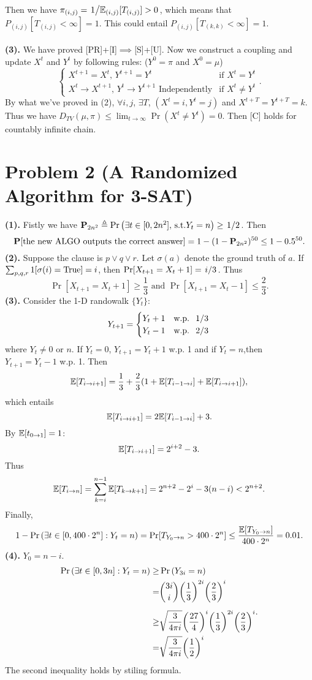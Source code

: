 \documentclass{article}
\begin{document}
Then we have $\pi_{(i,j)}=\flatfrac{1}{\=E_{(i,j)}[T_{(i,j)}]>0}$, which means that $P_{(i,j)}[T_{(i,j)}<\infty]=1$. This could entail $P_{(i,j)}[T_{(k,k)}<\infty]=1$.
\\\\
\textbf{(3).}
We have proved [PR]+[I]$\implies$[S]+[U]. Now we construct a coupling and update $X^t$ and  $Y^t$ by following rules: ($Y^0=\pi$ and $X^0=\mu$)
\[
	\begin{cases}
		X^{t+1}=X^t,\,Y^{t+1}=Y^t                                & \text{if }X^t=Y^t
		\\
		X^{t}\to X^{t+1},\,Y^{t}\to Y^{t+1}\text{ Independently} & \text{if }X^t\ne Y^t
	\end{cases}
	.\]
By what we've proved in (2), $\forall i,j$, $\exists T$, $(X^t=i,Y^t=j)$ and $X^{t+T}=Y^{t+T}=k$. Thus we have $D_{TV}(\mu,\pi)\le \lim_{t\to\infty}\Pr(X^t\ne Y^t)=0$.
Then [C] holds for countably infinite chain.
\newpage
\section*{Problem 2 (A Randomized Algorithm for 3-SAT)}
\textbf{(1).}
Fistly we have $\P_{2n^2}\defeq\Pr\qty(\exists t\in[0,2n^2],\,\-{s.t.}Y_t=n)\ge \flatfrac{1}{2}$. Then
\[
	\P[\text{the new ALGO outputs the correct answer}]
	=
	1-(1-\P_{2n^2})^{50}\le 1-0.5^{50}
	.\]
\textbf{(2).}
Suppose the clause is $p\lor q\lor r$. Let $\sigma(a)$ denote the ground truth of $a$. If $\sum_{p,q,r}1[\sigma(i)=\-{True}]=i$, then $\Pr[X_{t+1}=X_t+1]=\flatfrac{i}{3}$.
Thus
\[
	\Pr[X_{t+1}=X_t+1]\ge \frac{1}{3}\text{ and }\Pr[X_{t+1}=X_t-1]\le\frac{2}{3}
	.\]
\textbf{(3).}
Consider the 1-D randowalk $\{Y_t\}$:
\[
	Y_{t+1}=
	\begin{cases}
		Y_t+1 & \text{w.p. }\flatfrac{1}{3} \\
		Y_t-1 & \text{w.p. }\flatfrac{2}{3} \\
	\end{cases}
\] where $Y_t\ne 0$ or $n$.
If $Y_t=0$, $Y_{t+1}=Y_t+1$ w.p. 1 and if $Y_t=n$,then $Y_{t+1}=Y_t-1$ w.p. 1. Then
\[
	\=E[T_{i\to i+1}]=\frac{1}{3}+\frac{2}{3}(1+\=E[T_{i-1\to i}]+\=E[T_{i\to i+1}])
	,\] which entails
\[
	\=E[T_{i\to i+1}]=2\=E[T_{i-1\to i}]+3
	.\] By $\=E[t_{0\to 1}]=1$:
\[
	\=E[T_{i\to i+1}]=2^{i+2}-3
	.\] Thus
\[
	\=E[T_{i\to n}]=\sum_{k=i}^{n-1}\=E[T_{k\to k+1}]=2^{n+2}-2^i-3(n-i)<2^{n+2}
	.\]
Finally,
\[
	1-\Pr\qty(\exists t\in[0,400\cdot2^n]:Y_t=n)
	=
	\Pr[T_{Y_0\to n}>400\cdot2^n]
	\le
	\frac{\=E[T_{Y_0\to n}]}{400\cdot2^n}
	=
	0.01
	.\]
\textbf{(4).} $Y_0=n-i$.
\[
	\begin{aligned}
		\Pr\qty(\exists t\in[0,3n]:Y_t=n)
		\ge&
		\Pr\qty(Y_{3i}=n)
		\\=&
		\binom{3i}{i}\qty(\frac{1}{3})^{2i}\qty(\frac{2}{3})^i
		\\[5pt]\ge &
		\sqrt{\frac{3}{4\pi i}}\qty(\frac{27}{4})^i\qty(\frac{1}{3})^{2i}\qty(\frac{2}{3})^i
		\\=&
		\sqrt{\frac{3}{4\pi i}}\qty(\frac{1}{2})^i
	\end{aligned}
.\]
The second inequality holds by stiling formula.
\end{document}
